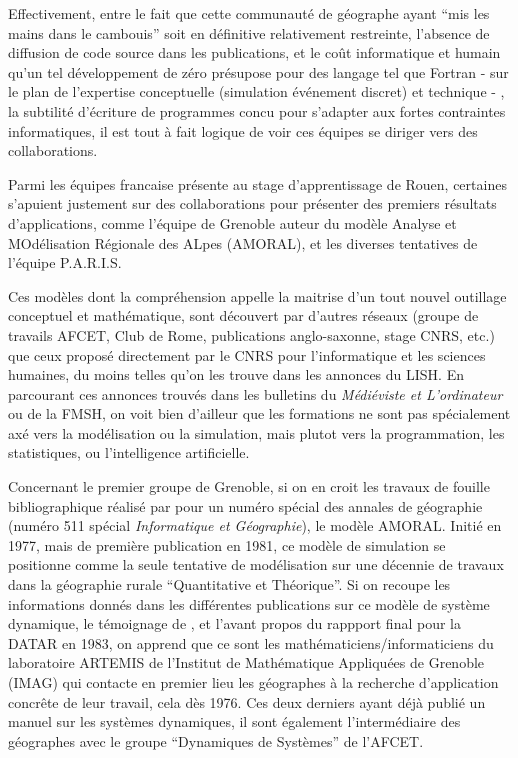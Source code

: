 Effectivement, entre le fait que cette communauté de géographe ayant \enquote{mis les mains dans le cambouis} soit en définitive relativement restreinte, l'absence de diffusion de code source dans les publications, et le coût informatique et humain qu'un tel développement de zéro présupose pour des langage tel que Fortran - sur le plan de l'expertise conceptuelle (simulation événement discret) et technique - , la subtilité d'écriture de programmes concu pour s'adapter aux fortes contraintes informatiques, il est tout à fait logique de voir ces équipes se diriger vers des collaborations. %

Parmi les équipes francaise présente au stage d'apprentissage de Rouen, certaines s'apuient justement sur des collaborations pour présenter des premiers résultats d'applications, comme l’équipe de Grenoble auteur du modèle Analyse et MOdélisation Régionale des ALpes (AMORAL), et les diverses tentatives de l’équipe P.A.R.I.S.  %

Ces modèles dont la compréhension appelle la maitrise d'un tout nouvel outillage conceptuel et mathématique, sont découvert par d'autres réseaux (groupe de travails AFCET, Club de Rome, publications anglo-saxonne, stage CNRS, etc.) que ceux proposé directement par le CNRS pour l'informatique et les sciences humaines, du moins telles qu'on les trouve dans les annonces du LISH. En parcourant ces annonces trouvés dans les bulletins du \textit{Médiéviste et L'ordinateur} ou de la FMSH, on voit bien d'ailleur que les formations ne sont pas spécialement axé vers la modélisation ou la simulation, mais plutot vers la programmation, les statistiques, ou l'intelligence artificielle.

Concernant le premier groupe de Grenoble, si on en croit les travaux de fouille bibliographique réalisé par \textcite{Rey1983} pour un numéro spécial des annales de géographie (numéro 511 spécial \textit{Informatique et Géographie}), le modèle AMORAL. Initié en 1977, mais de première publication en 1981, ce modèle de simulation se positionne comme la seule tentative de modélisation sur une décennie de travaux dans la géographie rurale \enquote{Quantitative et Théorique}. Si on recoupe les informations donnés dans les différentes publications sur ce modèle de système dynamique, le témoignage de \textcite{LeBerre1987}, et l'avant propos du rappport final pour la DATAR en 1983, on apprend  que ce sont les mathématiciens/informaticiens du laboratoire ARTEMIS de l’Institut de Mathématique Appliquées de Grenoble (IMAG) qui contacte en premier lieu les géographes à la recherche d’application concrête de leur travail, cela dès 1976. Ces deux derniers ayant déjà publié un manuel sur les systèmes dynamiques, il sont également l'intermédiaire des géographes avec le groupe \enquote{Dynamiques de Systèmes} de l'AFCET.

